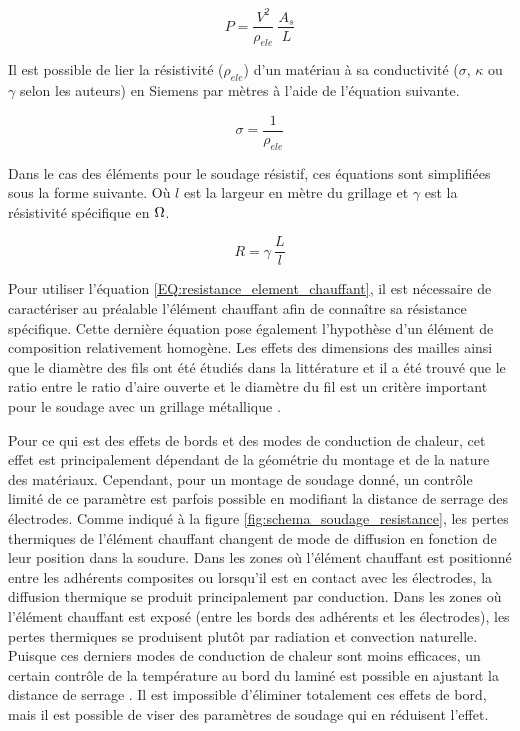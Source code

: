 \begin{equation}
P = \frac{V^2}{\rho_{ele}} \ \frac{A_s}{L}
\end{equation}

Il est possible de lier la résistivité ($\rho_{ele}$) d'un matériau à sa conductivité ($\sigma$, $\kappa$ ou $\gamma$ selon les auteurs) en Siemens par mètres à l'aide de l'équation suivante. 

\begin{equation}
\sigma = \frac{1}{\rho_{ele}}
\end{equation}

Dans le cas des éléments pour le soudage résistif, ces équations sont simplifiées sous la forme suivante. Où $l$ est la largeur en mètre du grillage et $\gamma$ est la résistivité spécifique en $\ohm$. 

\begin{equation}
R = \gamma \ \frac{L}{l}
\label{EQ:resistance_element_chauffant}
\end{equation}

Pour utiliser l'équation \ref{EQ:resistance_element_chauffant}, il est nécessaire de caractériser au préalable l'élément chauffant afin de connaître sa résistance spécifique. 
Cette dernière équation pose également l'hypothèse d'un élément de composition relativement homogène. 
Les effets des dimensions des mailles ainsi que le diamètre des fils ont été étudiés dans la littérature et il a été trouvé que le ratio entre le ratio d'aire ouverte et le diamètre du fil est un critère important pour le soudage avec un grillage métallique \cite{Dube2012a}. 

Pour ce qui est des effets de bords et des modes de conduction de chaleur, cet effet est principalement dépendant de la géométrie du montage et de la nature des matériaux. 
Cependant, pour un montage de soudage donné, un contrôle limité de ce paramètre est parfois possible en modifiant la distance de serrage des électrodes. 
Comme indiqué à la figure \ref{fig:schema_soudage_resistance}, les pertes thermiques de l'élément chauffant changent de mode de diffusion en fonction de leur position dans la soudure. 
Dans les zones où l'élément chauffant est positionné entre les adhérents composites ou lorsqu'il est en contact avec les électrodes, la diffusion thermique se produit principalement par conduction. 
Dans les zones où l'élément chauffant est exposé (entre les bords des adhérents et les électrodes), les pertes thermiques se produisent plutôt par radiation et convection naturelle. 
Puisque ces derniers modes de conduction de chaleur sont moins efficaces, un certain contrôle de la température au bord du laminé est possible en ajustant la distance de serrage \cite{Talbot2013}. 
Il est impossible d'éliminer totalement ces effets de bord, mais il est possible de viser des paramètres de soudage qui en réduisent l'effet. 

